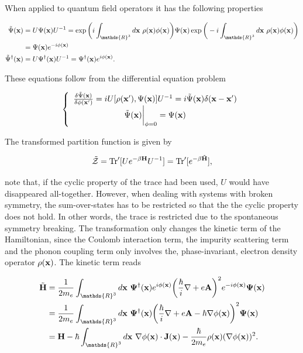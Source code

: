 \documentclass{homework}
\begin{document}
When applied to quantum field operators it has the following properties 

\begin{align}
    {\tilde \Psi}({\bf x}) &= U {\Psi}({\bf x}) U^{-1} = \exp\bigg(i \int_{\mathds{R}^3} d{\bf x} \blanky \rho({\bf x}) \phi({\bf x}) \bigg) {\Psi}({\bf x}) \exp\bigg(-i \int_{\mathds{R}^3} d{\bf x} \blanky \rho({\bf x}) \phi({\bf x}) \bigg) \\
    &= {\Psi}({\bf x}) e^{-i \phi({\bf x})} \\
    {\tilde \Psi}^\dagger({\bf x}) &= U {\Psi}^\dagger({\bf x}) U^{-1} = {\Psi}^\dagger({\bf x}) e^{i \phi({\bf x})}.
\end{align}

These equations follow from the differential equation problem

$$
    \left\{\begin{array}{cc}
         \frac{\delta \tilde{\Psi}({\bf x})}{\delta \phi({\bf x'})} = i U [\rho({\bf x}'), \Psi({\bf x})] U^{-1} = i \tilde{\Psi}({\bf x}) \delta({\bf x}-{\bf x}')  \\
         \tilde{\Psi}({\bf x})\bigg|_{\phi = 0} = \Psi({\bf x})
    \end{array} \right.
$$

The transformed partition function is given by 

$$
    \tilde{\mathcal{Z}} = \Tr' [U e^{-\beta {\bf H}} U^{-1}] = \Tr' [e^{-\beta \tilde{\bf H}}],
$$

note that, if the cyclic property of the trace had been used, $U$ would have disappeared all-together. However, when dealing with systems with broken symmetry, the sum-over-states has to be restricted so that the the cyclic property does not hold. In other words, the trace is restricted due to the spontaneous symmetry breaking. The transformation only changes the kinetic term of the Hamiltonian, since the Coulomb interaction term, the impurity scattering term and the phonon coupling term only involves the, phase-invariant, electron density operator $\rho({\bf x})$. The kinetic term reads

\begin{equation}
    \begin{split}
        \tilde{\bf H} &= \frac{1}{2m_e} \int_{\mathds{R}^3} d{\bf x} \blanky {\bf \Psi}^\dagger({\bf x}) e^{i\phi({\bf x)}} \bigg(\frac{\hbar}{i} \nabla + e {\bf A}\bigg)^2 e^{-i\phi({\bf x)}} {\bf \Psi}({\bf x}) \\
        &= \frac{1}{2m_e} \int_{\mathds{R}^3} d{\bf x} \blanky {\bf \Psi}^\dagger({\bf x}) \bigg(\frac{\hbar}{i} \nabla + e {\bf A} - \hbar \nabla \phi({\bf x})\bigg)^2 {\bf \Psi}({\bf x}) \\
        &= {\bf H} - \hbar \int_{\mathds{R}^3} d{\bf x} \blanky \nabla \phi({\bf x}) \cdot {\bf J}({\bf x}) - \frac{\hbar}{2m_e} \rho({\bf x}) (\nabla \phi({\bf x}))^2.
    \end{split}
\end{equation}
\end{document}
